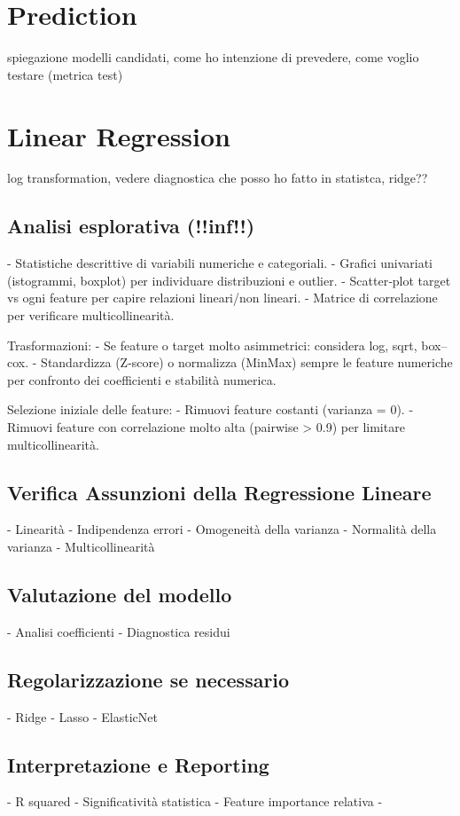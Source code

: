 \documentclass[a4paper,12pt]{report}  %
\begin{document}
\section{Prediction}
spiegazione modelli candidati, come ho intenzione di prevedere, come voglio testare (metrica test)

\section{Linear Regression}
log transformation, vedere diagnostica che posso ho fatto in statistca, ridge??

\subsection{Analisi esplorativa (!!inf!!)}
- Statistiche descrittive di variabili numeriche e categoriali.
- Grafici univariati (istogrammi, boxplot) per individuare distribuzioni e outlier.
- Scatter‐plot target vs ogni feature per capire relazioni lineari/non lineari.
- Matrice di correlazione per verificare multicollinearità.

Trasformazioni:
- Se feature o target molto asimmetrici: considera log, sqrt, box–cox.
- Standardizza (Z-score) o normalizza (MinMax) sempre le feature numeriche per confronto dei coefficienti e stabilità numerica.

Selezione iniziale delle feature:
- Rimuovi feature costanti (varianza = 0).
- Rimuovi feature con correlazione molto alta (pairwise > 0.9) per limitare multicollinearità.
\subsection{Verifica Assunzioni della Regressione Lineare}
- Linearità
- Indipendenza errori
- Omogeneità della varianza
- Normalità della varianza
- Multicollinearità

\subsection{Valutazione del modello}
- Analisi coefficienti
- Diagnostica residui

\subsection{Regolarizzazione se necessario}
- Ridge
- Lasso
- ElasticNet

\subsection{Interpretazione e Reporting}
-  R squared
- Significatività statistica
- Feature importance relativa
- 
\end{document}
